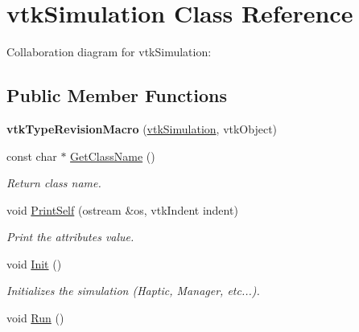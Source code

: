 \hypertarget{classvtkSimulation}{
\section{vtkSimulation Class Reference}
\label{classvtkSimulation}
}


Collaboration diagram for vtkSimulation:\subsection*{Public Member Functions}
\begin{DoxyCompactItemize}
\item 
\hypertarget{classvtkSimulation_a8e06717c5dd8ce0adadd7b61ae366d50}{
{\bfseries vtkTypeRevisionMacro} (\hyperlink{classvtkSimulation}{vtkSimulation}, vtkObject)}
\label{classvtkSimulation_a8e06717c5dd8ce0adadd7b61ae366d50}

\item 
\hypertarget{classvtkSimulation_a7bb94f3b9a7e1f60048554726a1130b4}{
const char $\ast$ \hyperlink{classvtkSimulation_a7bb94f3b9a7e1f60048554726a1130b4}{GetClassName} ()}
\label{classvtkSimulation_a7bb94f3b9a7e1f60048554726a1130b4}

\begin{DoxyCompactList}\small\item\em Return class name. \item\end{DoxyCompactList}\item 
\hypertarget{classvtkSimulation_a152b2ade8f62f1448bf16666fb3e91e0}{
void \hyperlink{classvtkSimulation_a152b2ade8f62f1448bf16666fb3e91e0}{PrintSelf} (ostream \&os, vtkIndent indent)}
\label{classvtkSimulation_a152b2ade8f62f1448bf16666fb3e91e0}

\begin{DoxyCompactList}\small\item\em Print the attributes value. \item\end{DoxyCompactList}\item 
\hypertarget{classvtkSimulation_a386a0ef552396a6348a9aa0fa389a6ca}{
void \hyperlink{classvtkSimulation_a386a0ef552396a6348a9aa0fa389a6ca}{Init} ()}
\label{classvtkSimulation_a386a0ef552396a6348a9aa0fa389a6ca}

\begin{DoxyCompactList}\small\item\em Initializes the simulation (Haptic, Manager, etc...). \item\end{DoxyCompactList}\item 
\hypertarget{classvtkSimulation_a4fc5595a90345a3e288d65ecc462bb2b}{
void \hyperlink{classvtkSimulation_a4fc5595a90345a3e288d65ecc462bb2b}{Run} ()}
\label{classvtkSimulation_a4fc5595a90345a3e288d65ecc462bb2b}


\end{DoxyCompactItemize}
